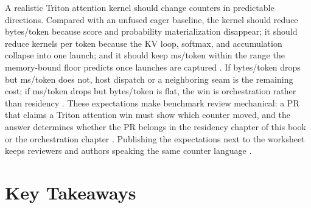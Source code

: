 A realistic Triton attention kernel should change counters in predictable directions. Compared with an unfused eager baseline, the kernel should reduce bytes/token because score and probability materialization disappear; it should reduce kernels per token because the KV loop, softmax, and accumulation collapse into one launch; and it should keep ms/token within the range the memory-bound floor predicts once launches are captured \citep{dao2022flashattention,memoryfloor2026,taxbreak2026}. If bytes/token drops but ms/token does not, host dispatch or a neighboring seam is the remaining cost; if ms/token drops but bytes/token is flat, the win is orchestration rather than residency \citep{patel2025llminference,nvidia2024cudagraphs}. These expectations make benchmark review mechanical: a PR that claims a Triton attention win must show which counter moved, and the answer determines whether the PR belongs in the residency chapter of this book or the orchestration chapter \citep{memoryfloor2026,chen2020compilerbasedhardw}. Publishing the expectations next to the worksheet keeps reviewers and authors speaking the same counter language \citep{taxbreak2026,patel2025llminference}.

\section{Key Takeaways}
\label{sec:ch17_key_takeaways}

